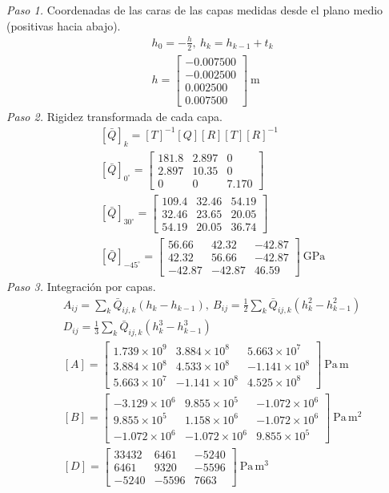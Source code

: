 \documentclass[11pt]{article}
\begin{document}
\textit{Paso 1.} Coordenadas de las caras de las capas medidas desde el plano medio (positivas hacia abajo).
\begin{align*}
&h_0=-\tfrac{h}{2},\ h_k=h_{k-1}+t_k \\
&h=\begin{bmatrix}-0.007500 \\ -0.002500 \\ 0.002500 \\ 0.007500\end{bmatrix}\ \mathrm{m}
\end{align*}
\textit{Paso 2.} Rigidez transformada de cada capa.
\begin{align*}
&[\bar Q]_k=[T]^{-1}[Q][R][T][R]^{-1} \\
&[\bar Q]_{0^\circ}=\begin{bmatrix}181.8 & 2.897 & 0 \\ 2.897 & 10.35 & 0 \\ 0 & 0 & 7.170\end{bmatrix} \\
&[\bar Q]_{30^\circ}=\begin{bmatrix}109.4 & 32.46 & 54.19 \\ 32.46 & 23.65 & 20.05 \\ 54.19 & 20.05 & 36.74\end{bmatrix} \\
&[\bar Q]_{-45^\circ}=\begin{bmatrix}56.66 & 42.32 & -42.87 \\ 42.32 & 56.66 & -42.87 \\ -42.87 & -42.87 & 46.59\end{bmatrix}\ \mathrm{GPa}
\end{align*}
\textit{Paso 3.} Integración por capas.
\begin{align*}
&A_{ij}=\sum_k \bar Q_{ij,k}(h_k-h_{k-1}),\ B_{ij}=\tfrac12\sum_k \bar Q_{ij,k}(h_k^2-h_{k-1}^2) \\
&D_{ij}=\tfrac13\sum_k \bar Q_{ij,k}(h_k^3-h_{k-1}^3) \\
&[A]=\begin{bmatrix}1.739\times10^{9} & 3.884\times10^{8} & 5.663\times10^{7} \\ 3.884\times10^{8} & 4.533\times10^{8} & -1.141\times10^{8} \\ 5.663\times10^{7} & -1.141\times10^{8} & 4.525\times10^{8}\end{bmatrix}\ \mathrm{Pa\,m} \\
&[B]=\begin{bmatrix}-3.129\times10^{6} & 9.855\times10^{5} & -1.072\times10^{6} \\ 9.855\times10^{5} & 1.158\times10^{6} & -1.072\times10^{6} \\ -1.072\times10^{6} & -1.072\times10^{6} & 9.855\times10^{5}\end{bmatrix}\ \mathrm{Pa\,m^2} \\
&[D]=\begin{bmatrix}33432 & 6461 & -5240 \\ 6461 & 9320 & -5596 \\ -5240 & -5596 & 7663\end{bmatrix}\ \mathrm{Pa\,m^3}
\end{align*}
\end{document}
